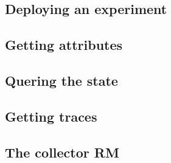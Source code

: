 \subsection{Deploying an experiment}


\subsection{Getting attributes}

\subsection{Quering the state}

\subsection{Getting traces}
    


\subsection{The collector RM}




